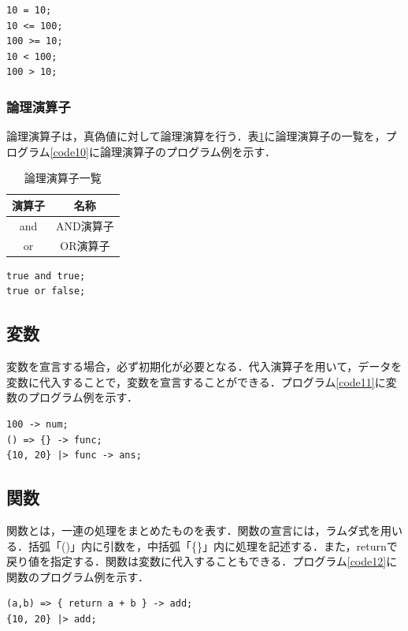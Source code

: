 \documentclass[10pt,a4j]{ltjsarticle}
\begin{document}
\begin{lstlisting}[caption=比較演算子のプログラム例, label=code09]
10 = 10;
10 <= 100;
100 >= 10; 
10 < 100;
100 > 10;
\end{lstlisting}

\subsubsection{論理演算子}
論理演算子は，真偽値に対して論理演算を行う．表\ref{tab:table03}に論理演算子の一覧を，プログラム\ref{code10}に論理演算子のプログラム例を示す．

\begin{table}[H]
 \caption{論理演算子一覧}
 \label{tab:table03}
 \centering
  \begin{tabular}{cc}
   \hline
   演算子 & 名称 \\
   \hline \hline
   and & AND演算子 \\
   or & OR演算子 \\
   \hline
  \end{tabular}
\end{table}

\begin{lstlisting}[caption=論理演算子のプログラム例, label=code10]
true and true;
true or false;
\end{lstlisting}

\subsection{変数}
変数を宣言する場合，必ず初期化が必要となる．代入演算子を用いて，データを変数に代入することで，変数を宣言することができる．プログラム\ref{code11}に変数のプログラム例を示す．

\begin{lstlisting}[caption=変数のプログラム例, label=code11]
100 -> num;
() => {} -> func;
{10, 20} |> func -> ans; 
\end{lstlisting}

\subsection{関数}
関数とは，一連の処理をまとめたものを表す．関数の宣言には，ラムダ式を用いる．括弧「()」内に引数を，中括弧「\{\}」内に処理を記述する．また，returnで戻り値を指定する．関数は変数に代入することもできる．プログラム\ref{code12}に関数のプログラム例を示す．

\begin{lstlisting}[caption=関数のプログラム例, label=code12]
(a,b) => { return a + b } -> add;
{10, 20} |> add;
\end{lstlisting}
\end{document}

